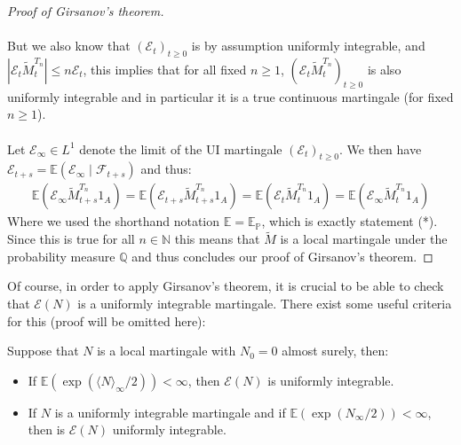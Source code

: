 \documentclass[../mainfile.tex]{subfiles}
\begin{document}
\begin{proof}[Proof of Girsanov's theorem]
\\\\
But we also know that $(\mathcal{E}_t)_{t \geq 0}$ is by assumption uniformly integrable, and $| \mathcal{E}_t\tilde{M}_t^{T_n}| \leq n \mathcal{E}_t$, this implies that for all fixed $n \geq 1$, $( \mathcal{E}_t \tilde{M}_t^{T_n})_{t \geq 0}$ is also uniformly integrable and in particular it is a true continuous martingale (for fixed $n \geq 1$). 
\\\\
Let $\mathcal{E}_\infty \in L^1$ denote the limit of the UI martingale $( \mathcal{E}_t)_{t \geq 0}$. We then have $\mathcal{E}_{t+s} = \mathbb{E}( \mathcal{E}_\infty \mid \mathcal{F}_{t+s})$ and thus: 
\begin{align*}
\mathbb{E}( \mathcal{E}_\infty \tilde{M}_{t+s}^{T_n} 1_A)= \mathbb{E}(\mathcal{E}_{t+s} \tilde{M}_{t+s}^{T_n} 1_A)  = \mathbb{E}( \mathcal{E}_t \tilde{M}_t^{T_n} 1_A)= \mathbb{E}( \mathcal{E}_\infty \tilde{M}_t^{T_n} 1_A)
\end{align*}
Where we used the shorthand notation $\mathbb{E}= \mathbb{E}_\mathbb{P}$, which is exactly statement (*). Since this is true for all $n \in \mathbb{N}$ this means that $\tilde{M}$ is a local martingale under the probability measure $\mathbb{Q}$ and thus concludes our proof of Girsanov's theorem. 
\end{proof}
Of course, in order to apply Girsanov's theorem, it is crucial to be able to check that $\mathcal{E}(N)$ is a uniformly integrable martingale. There exist some useful criteria for this (proof will be omitted here):
\begin{prop} Suppose that $N$ is a local martingale  with $N_0=0$ almost surely, then:
\begin{itemize}
\item If $\mathbb{E}( \exp( \langle N \rangle_\infty /2)) < \infty$, then $\mathcal{E}(N)$  is uniformly integrable.
\item If $N$ is a uniformly integrable martingale and if $\mathbb{E}( \exp( N_\infty /2)) < \infty$, then is $\mathcal{E}(N)$ uniformly integrable.
\end{itemize}
\end{prop}
\newpage
\end{document}
